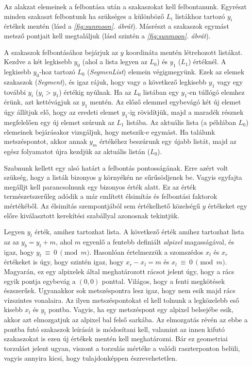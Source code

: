 \documentclass[12pt]{report}
\theoremstyle{definition}
\newcommand{\func}[1]{{\textsl{#1}}}
\begin{document}
Az alakzat elemeinek a felbontása után a szakaszokat kell felbontanunk. Egyrészt
minden szakaszt felbontunk ha szükséges a különböző $L_i$ listákhoz tartozó
$y_i$ értékek mentén (lásd a \emph{\ref{fig:sunmoon}. ábrát}). Másrészt a szakaszok
egymást metsző pontjait kell megtaláljuk (lásd szintén a \emph{\ref{fig:sunmoon}.
ábrát}).

A szakaszok felbontásához bejárjuk az $y$ koordináta mentén létrehozott
listákat. Kezdve a két legkisebb $y_0$ (ahol a lista legyen az $L_0$) és $y_1$
($L_1$) értéknél. A legkisebb $y_0$-hoz tartozó $L_0$ (\func{SegmenList})
elemein végigmegyünk. Ezek az elemek szakaszok (\func{Segment}), és igaz rájuk,
hogy vagy a következő legkisebb $y_1$ vagy egy további $y_i$ ($y_i > y_1$)
értékig nyúlnak. Ha az $L_0$ listában egy $y_1$-en túllógó elemhez érünk, azt
kettévágjuk az $y_1$ mentén. Az előző elemmel egybevágó két új elemet úgy
állítjuk elő, hogy az eredeti elemet $y_1$-ig rövidítjük, majd a maradék
résznek megfelelően egy új elemet szúrunk az $L_1$ listába. Az aktuális lista
(a példában $L_0$) elemeinek bejárásakor vizsgáljuk, hogy metszik-e egymást. Ha
találunk metszéspontot, akkor annak $y_m$ értékéhez beszúrunk egy újabb listát,
majd az egész folyamatot újra kezdjük az aktuális listán ($L_0$).

Szabnunk kellett egy alsó határt a felbontás pontosságának. Erre azért volt
szükség, hogy a listák bizonyos $y$ környékén ne sűrűsödjenek be. Vagyis
egyfajta megálljt kell parancsolnunk egy bizonyos érték alatt. Ez az érték
természetszerűleg adódik a már említett élsimítás és felbontási faktorok
mértékéből. Az élsimítás szempontjából sem értékelhető közelségű $y$ értékeket
egy előre kiválasztott kerekítési szabállyal azonosnak tekintjük.

Legyen $y_t$ érték, amihez tartozhat lista. A következő érték amihez tartozhat
lista az az $y_b = y_t + m$, ahol $m$ egyenlő a fentebb definiált
\emph{alpixel} magasságával, és igaz, hogy $y_t~\equiv~0~\pmod{m}$. Hasonlóan
értelmezzük a szomszédos $x_l$ és $x_r$ értékeket is úgy, hogy szintén igaz,
hogy $x_r - x_l = m$ és $x_l~\equiv~0~\pmod{m}$. Magyarán, ez egy alpixelek
által meghatározott rácsot jelent úgy, hogy a rács egyik pontja egybevág a $(0,
0)$ ponttal. Világos, hogy a fenti megkötések észszerűek. Ugyanakkor sok
metszéspontra lesz igaz, hogy nem esik majd rács vízszintes vonalaira. Az ilyen
metszéspontokat el kell tolnunk a legközelebb eső kisebb $x_l$ és $y_t$ pontba.
Vagyis, ha egy metszéspont egy alpixel belsejébe esik, akkor azt elmozgatjuk az
alpixel bal felső sarkába. Az elmozgatás révén az ebbe a pontba futó szakaszok
leírását is módosítani kell, valamint az innen kifutó szakaszokat is ezen új
értékek mentén kell meghatározni. Bár ez geometriai torzulást jelent ugyan,
viszont a torzulás mértéke a valódi raszterponton belüli, vagyis annyira kicsi,
hogy tulajdonképpen észrevehetetlen.
\end{document}
